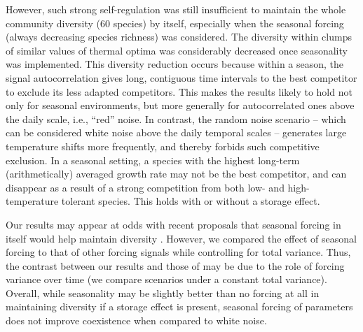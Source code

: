 \documentclass[smallcondensed,referee]{svjour3}       %
\begin{document}
However, such strong self-regulation was still insufficient to maintain
the whole community diversity (60 species) by itself, especially when
the seasonal forcing (always decreasing species richness) was considered.
The diversity within clumps of similar values of thermal optima was
considerably decreased once seasonality was implemented. This diversity
reduction occurs because within a season, the signal autocorrelation
gives long, contiguous time intervals to the best competitor to exclude
its less adapted competitors. This makes the results likely to hold
not only for seasonal environments, but more generally for autocorrelated
ones above the daily scale, i.e., ``red'' noise. In contrast, the
random noise scenario -- which can be considered white noise above
the daily temporal scales -- generates large temperature shifts more
frequently, and thereby forbids such competitive exclusion. In a seasonal
setting, a species with the highest long-term (arithmetically) averaged
growth rate may not be the best competitor, and can disappear as a
result of a strong competition from both low- and high-temperature
tolerant species. This holds with or without a storage effect. 

Our results may appear at odds with recent proposals that seasonal
forcing in itself would help maintain diversity \citep{sakavara_lumpy_2018}.
However, we compared the effect of seasonal forcing to that of other
forcing signals while controlling for total variance. Thus, the contrast
between our results and those of \citet{sakavara_lumpy_2018} may
be due to the role of forcing variance over time (we compare scenarios
under a constant total variance). Overall, while seasonality may be
slightly better than no forcing at all in maintaining diversity if
a storage effect is present, seasonal forcing of parameters does not
improve coexistence when compared to white noise.
\end{document}
